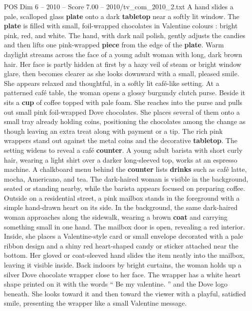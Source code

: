 \begin{textsample}{POS Dim 6 – 2010 – Score 7.00 – 2010/tv\_com\_2010\_2.txt}  \label{ex:f6_pos_086}
A hand slides a pale, scalloped glass \textbf{plate} onto a dark \textbf{tabletop} near a softly lit window.
The \textbf{plate} is filled with small, foil-wrapped chocolates in Valentine colours : bright pink, red, and white.
The hand, with dark nail polish, gently adjusts the candies and then lifts one pink-wrapped \textbf{piece} from the edge of the \textbf{plate}.
Warm daylight streams across the face of a young adult woman with long, dark brown hair.
Her face is partly hidden at first by a hazy veil of steam or bright window glare, then becomes clearer as she looks downward with a small, pleased smile.
She appears relaxed and thoughtful, in a softly lit café-like setting.
At a patterned café table, the woman opens a glossy burgundy clutch purse.
Beside it sits a \textbf{cup} of coffee topped with pale foam.
She reaches into the purse and pulls out small pink foil-wrapped Dove chocolates.
She places several of them onto a small tray already holding coins, positioning the chocolates among the change as though leaving an extra treat along with payment or a tip.
The rich pink wrappers stand out against the metal coins and the decorative \textbf{tabletop}.
The setting widens to reveal a café \textbf{counter}.
A young adult barista with short curly hair, wearing a light shirt over a darker long-sleeved top, works at an espresso machine.
A chalkboard menu behind the \textbf{counter} lists \textbf{drinks} such as café latte, mocha, Americano, and tea.
The dark-haired woman is visible in the background, seated or standing nearby, while the barista appears focused on preparing coffee.
Outside on a residential street, a pink mailbox stands in the foreground with a simple hand-drawn heart on its side.
In the background, the same dark-haired woman approaches along the sidewalk, wearing a brown \textbf{coat} and carrying something small in one hand.
The mailbox door is open, revealing a red interior.
Inside, she places a Valentine-style card or small envelope decorated with a pale ribbon design and a shiny red heart-shaped candy or sticker attached near the bottom.
Her gloved or coat-sleeved hand slides the item neatly into the mailbox, leaving it visible inside.
Back indoors by bright curtains, the woman holds up a silver Dove chocolate wrapper close to her face.
The wrapper has a white heart shape printed on it with the words “ Be my valentine. ” and the Dove logo beneath.
She looks toward it and then toward the viewer with a playful, satisfied smile, presenting the wrapper like a small Valentine message.

\end{textsample}
